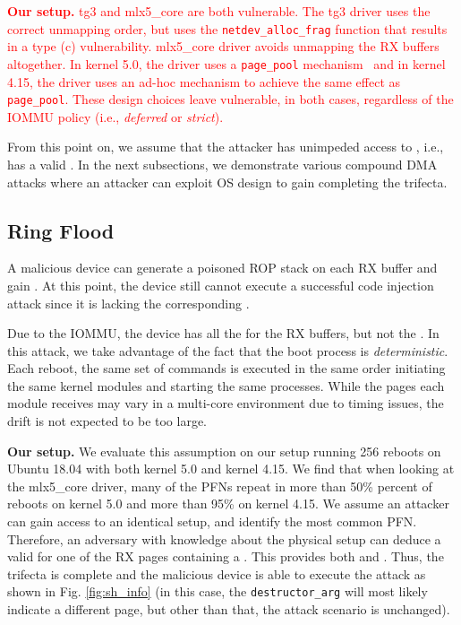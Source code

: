 \smallskip
\textcolor{red}{\noindent\textbf{Our setup.} tg3 and mlx5\_core are both vulnerable. The tg3 driver uses the correct unmapping order, but uses the \texttt{netdev\_alloc\_frag} function that results in a type (c) \subpage{} vulnerability. mlx5\_core driver avoids unmapping the RX buffers altogether. In kernel 5.0, the driver uses a \texttt{page\_pool} mechanism~\cite{page_pool} and in kernel 4.15, the driver uses an ad-hoc mechanism to achieve the same effect as \texttt{page\_pool}. These design choices leave \shinfo{} vulnerable, in both cases, regardless of the IOMMU policy (i.e., \emph{deferred} or \emph{strict}). }


From this point on, we assume that the attacker has unimpeded access to \means, i.e., has a valid \oportunity{}. In the next subsections, we demonstrate various compound DMA attacks where an attacker can exploit OS design to gain \motivation{} completing the trifecta.

\subsection{Ring Flood}\label{sec:ringflod}
A malicious device can generate a poisoned ROP stack on each RX buffer and gain \motivation{}. At this point, the device still cannot execute a successful code injection attack since it is lacking the corresponding \kva.

Due to the IOMMU, the device has all the \iova{} for the RX buffers, but not the \kva{}. In this attack, we take advantage of the fact that the boot process is \emph{deterministic}. Each reboot, the same set of commands is executed in the same order initiating the same kernel modules and starting the same processes. While the pages each module receives may vary in a multi-core environment due to timing issues, the drift is not expected to be too large. 

\smallskip
\noindent\textbf{Our setup.} We evaluate this assumption on our setup running 256 reboots on Ubuntu 18.04 with both kernel 5.0 and kernel 4.15.
We find that when looking at the mlx5\_core driver, many of the PFNs repeat in more than 50\% percent of reboots on kernel 5.0 and more than 95\% on kernel 4.15. We assume an attacker can gain access to an identical setup, and identify the most common PFN. Therefore, an adversary with knowledge about the physical setup can deduce a valid \kva{} for one of the RX pages containing a \mabaf. This provides both \means{} and \motivation{}. Thus, the trifecta is complete and the malicious device is able to execute the attack as shown in Fig. \ref{fig:sh_info} (in this case, the \texttt{destructor\_arg} will most likely indicate a different page, but other than that, the attack scenario is unchanged).


